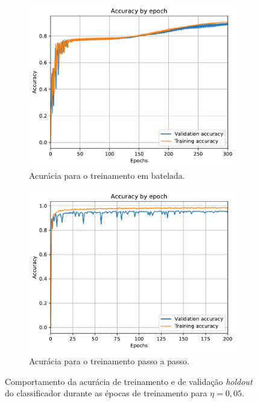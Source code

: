 \begin{figure}[H]
	\centering
	\begin{subfigure}{0.49\textwidth}
		\includegraphics[width=\linewidth]{img/0-05/Accuracy_by_epoch-Batch-300}
		\caption{Acurácia para o treinamento em batelada.}
		\label{fig:Accuracy_by_epoch-batch-300-0-05}
	\end{subfigure}
	\begin{subfigure}{0.49\textwidth}
		\includegraphics[width=\linewidth]{img/0-05/Accuracy_by_epoch-Step-200}
		\caption{Acurácia para o treinamento passo a passo.}
		\label{fig:Accuracy_by_epoch-Step-200-0-05}
	\end{subfigure}
	\caption{Comportamento da acurácia de treinamento e de validação \textit{holdout} do classificador durante as épocas de treinamento para $\eta = 0,05$. }
\end{figure}


